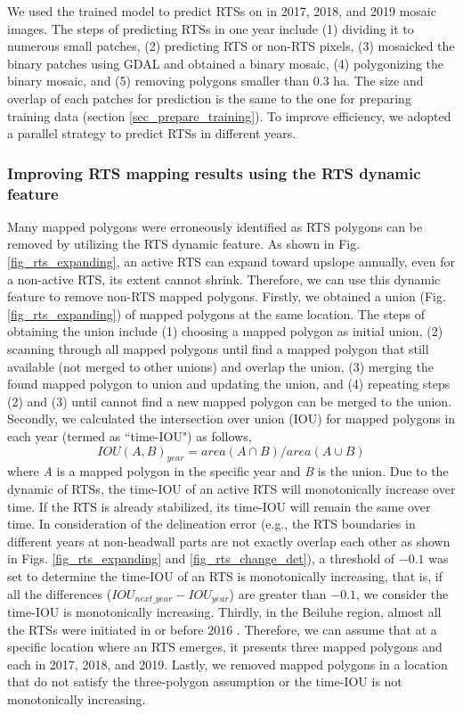 \documentclass[authoryear,preprint,review,12pt]{elsarticle}
\begin{document}
We used the trained model to predict RTSs on in 2017, 2018, and 2019 mosaic images. 
The steps of predicting RTSs in one year include (1) dividing it to numerous small patches, (2) predicting RTS or non-RTS pixels, (3) mosaicked the binary patches using GDAL and obtained a binary mosaic, (4) polygonizing the binary mosaic, and (5) removing polygons smaller than 0.3 ha. 
The size and overlap of each patches for prediction is the same to the one for preparing training data (section \ref{sec_prepare_training}). 
To improve efficiency, we adopted a parallel strategy to predict RTSs in different years.


\subsubsection{Improving RTS mapping results using the RTS dynamic feature}
\label{sec_improving_using_rts_dynamic}

Many mapped polygons were erroneously identified as RTS polygons can be removed by utilizing the RTS dynamic feature. 
As shown in Fig. \ref{fig_rts_expanding}, an active RTS can expand toward upslope annually, even for a non-active RTS, its extent cannot shrink. 
Therefore, we can use this dynamic feature to remove non-RTS mapped polygons. 
Firstly, we obtained a union (Fig. \ref{fig_rts_expanding}) of mapped polygons at the same location.
The steps of obtaining the union include (1) choosing a mapped polygon as initial union, (2) scanning through all mapped polygons until find a mapped polygon that still available (not merged to other unions) and overlap the union, (3) merging the found mapped polygon to union and updating the union, and (4) repeating steps (2) and (3) until cannot find a new mapped polygon can be merged to the union. 
Secondly, we calculated the intersection over union (IOU) for mapped polygons in each year (termed as ``time-IOU") as follows, 
\begin{equation}
IOU(A,B)_{year}=area(A \cap B)/area(A \cup B)
\label{equ_time_iou}
\end{equation}
where \emph{A} is a mapped polygon in the specific year and \emph{B} is the union. 
Due to the dynamic of RTSs, the time-IOU of an active RTS will monotonically increase over time. 
If the RTS is already stabilized, its time-IOU will remain the same over time. 
In consideration of the delineation error (e.g., the RTS boundaries in different years at non-headwall parts are not exactly overlap each other as shown in Figs. \ref{fig_rts_expanding} and \ref{fig_rts_change_det}), a threshold of $-0.1$ was set to determine the time-IOU of an RTS is monotonically increasing, that is, if all the differences ($IOU_{next\_year}-IOU_{year}$) are greater than $-0.1$, we consider the time-IOU is monotonically increasing. 
Thirdly, in the Beiluhe region, almost all the RTSs were initiated in or before 2016 \citep{luo2019recent}.
Therefore, we can assume that at a specific location where an RTS emerges, it presents three mapped polygons and each in 2017, 2018, and 2019. 
Lastly, we removed mapped polygons in a location that do not satisfy the three-polygon assumption or the time-IOU is not monotonically increasing.
 
\end{document}

